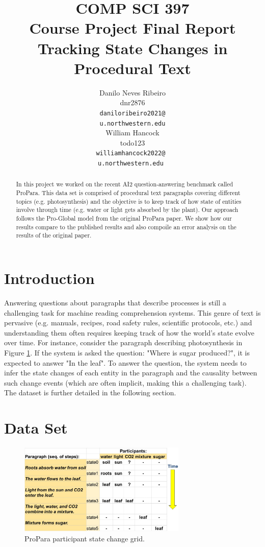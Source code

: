 \documentclass[11pt,a4paper]{article}
\title{COMP SCI 397 \\
    Course Project Final Report \\
    Tracking State Changes in Procedural Text}
\author{Danilo Neves Ribeiro \\
  dnr2876 \\
  {\tt daniloribeiro2021@} \\
  {\tt u.northwestern.edu} \\\And
  William Hancock \\
  todo123 \\
  {\tt williamhancock2022@ } \\
  {\tt u.northwestern.edu } \\}
\date{}
\begin{document}
\maketitle
\begin{abstract}
  In this project we worked on the recent AI2 question-answering 
  benchmark called ProPara. This data set is comprised of procedural 
  text paragraphs covering different topics (e.g. photosynthesis) and 
  the objective is to keep track of how state of entities involve through 
  time (e.g. water or light gets absorbed by the plant). Our approach 
  follows the Pro-Global model from the original ProPara paper. We 
  show how our results compare to the published results and also 
  compoile an error analysis on the results of the original paper.
\end{abstract}

\section{Introduction}

Answering questions about paragraphs that describe processes is still 
a challenging task for machine reading comprehension systems. This 
genre of text is pervasive (e.g. manuals, recipes, road safety rules, 
scientific protocols, etc.) and understanding them often requires 
keeping track of how the world’s state evolve over time. For instance, 
consider the paragraph describing photosynthesis in Figure 
\ref{fig:participant-grid}. If the system is asked the question: 
"Where is sugar produced?", it is expected to answer "In the leaf". 
To answer the question, the system needs to infer the state changes 
of each entity in the paragraph and the causality between such change 
events (which are often implicit, making this a challenging task). The 
dataset is further detailed in the following section.

\section{Data Set}

\begin{figure}[h]
\includegraphics[width=8cm]{participant-grid-simple.JPG}
\caption{ProPara participant state change grid.}
\label{fig:participant-grid}
\end{figure}
\end{document}
